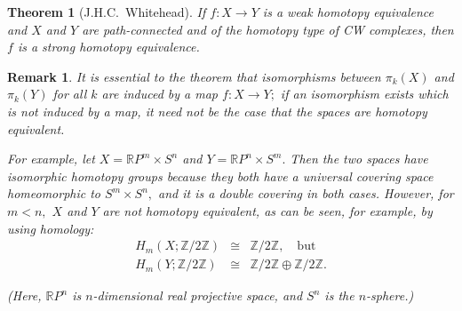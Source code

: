\documentclass[12pt]{article}
\newcommand{\reals}{{\mathbb R}} %
\newcommand{\integs}{{\mathbb Z}} %
\newcommand{\funcsig}[2]{#1\rightarrow #2}
\newcommand{\funcdef}[3]{#1:\funcsig{#2}{#3}}
\newtheorem{thm}{Theorem}
\newtheorem{rmk}{Remark}
\newcommand{\cross}{\times}
\newcommand{\isom}{\cong}
\newcommand{\rp}{\reals P} %
\newcommand{\zmod}[1]{\integs / #1\integs} %
\begin{document}

\begin{thm}[J.H.C.~Whitehead]
If $\funcdef{f}{X}{Y}$ is a weak homotopy equivalence and $X$ and $Y$ 
are path-connected and of the homotopy type of CW complexes, then $f$ is a strong homotopy equivalence.
\end{thm}
\begin{rmk}
It is essential to the theorem that isomorphisms between $\pi_k(X)$ and $\pi_k(Y)$ for all $k$ are induced by a map $\funcdef{f}{X}{Y};$ if an isomorphism exists which is not induced by a map, it need not be the case that the spaces are homotopy equivalent.

For example, let $X=\rp^m\cross S^n$ and $Y=\rp^n\cross S^m.$
Then the two spaces have isomorphic homotopy groups because they both have a universal covering space homeomorphic to $S^m\cross S^n,$ and it is a double covering in both cases. However, for $m<n,$ $X$ and $Y$ are not homotopy equivalent, as can be seen, for example, by using homology: 
\begin{eqnarray*}
H_m(X;\zmod{2})&\isom&\zmod{2}, \quad \textrm{but} \\
H_m(Y;\zmod{2})&\isom&\zmod{2}\oplus\zmod{2}.
\end{eqnarray*}

(Here, $\rp^n$ is $n$-dimensional real projective space, and $S^n$ is the $n$-sphere.)

\end{rmk}
\end{document}
